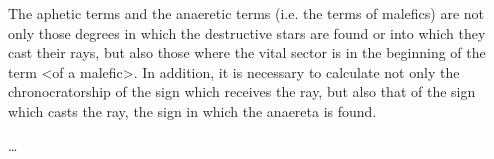 \enlargethispage{2\baselineskip}
The aphetic terms and the anaeretic terms (i.e. the terms of malefics) are not only those degrees in which the destructive stars are found or into which they cast their rays, but also those where the vital sector is in the beginning of the term <of a malefic>.  In addition, it is necessary to calculate not only the chronocratorship of the sign which receives the ray, but also that of the sign which casts the ray, the sign in which the anaereta is found.

\ldots

\newpage